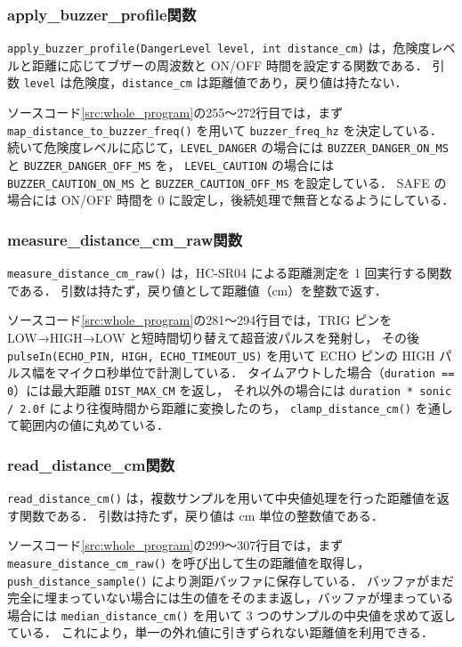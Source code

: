 \documentclass[a4paper,fontsize=11pt,line_length=40zw,number_of_lines=35,baselineskip=1.7zw]{jlreq}
\begin{document}
\subsubsection{apply\_buzzer\_profile関数}

\lstinline|apply_buzzer_profile(DangerLevel level, int distance_cm)| は，危険度レベルと距離に応じてブザーの周波数と ON/OFF 時間を設定する関数である．
引数 \lstinline|level| は危険度，\lstinline|distance_cm| は距離値であり，戻り値は持たない．

ソースコード\ref{src:whole_program}の255〜272行目では，まず \lstinline|map_distance_to_buzzer_freq()| を用いて
\lstinline|buzzer_freq_hz| を決定している．
続いて危険度レベルに応じて，\lstinline|LEVEL_DANGER| の場合には \lstinline|BUZZER_DANGER_ON_MS| と \lstinline|BUZZER_DANGER_OFF_MS| を，
\lstinline|LEVEL_CAUTION| の場合には \lstinline|BUZZER_CAUTION_ON_MS| と \lstinline|BUZZER_CAUTION_OFF_MS| を設定している．
SAFE の場合には ON/OFF 時間を 0 に設定し，後続処理で無音となるようにしている．

\subsubsection{measure\_distance\_cm\_raw関数}

\lstinline|measure_distance_cm_raw()| は，HC-SR04 による距離測定を 1 回実行する関数である．
引数は持たず，戻り値として距離値（cm）を整数で返す．

ソースコード\ref{src:whole_program}の281〜294行目では，TRIG ピンを LOW→HIGH→LOW と短時間切り替えて超音波パルスを発射し，
その後 \lstinline|pulseIn(ECHO_PIN, HIGH, ECHO_TIMEOUT_US)| を用いて ECHO ピンの HIGH パルス幅をマイクロ秒単位で計測している．
タイムアウトした場合（\lstinline|duration == 0|）には最大距離 \lstinline|DIST_MAX_CM| を返し，
それ以外の場合には \lstinline|duration * sonic / 2.0f| により往復時間から距離に変換したのち，
\lstinline|clamp_distance_cm()| を通して範囲内の値に丸めている．

\subsubsection{read\_distance\_cm関数}

\lstinline|read_distance_cm()| は，複数サンプルを用いて中央値処理を行った距離値を返す関数である．
引数は持たず，戻り値は cm 単位の整数値である．

ソースコード\ref{src:whole_program}の299〜307行目では，まず \lstinline|measure_distance_cm_raw()| を呼び出して生の距離値を取得し，
\lstinline|push_distance_sample()| により測距バッファに保存している．
バッファがまだ完全に埋まっていない場合には生の値をそのまま返し，バッファが埋まっている場合には
\lstinline|median_distance_cm()| を用いて 3 つのサンプルの中央値を求めて返している．
これにより，単一の外れ値に引きずられない距離値を利用できる．
\end{document}
